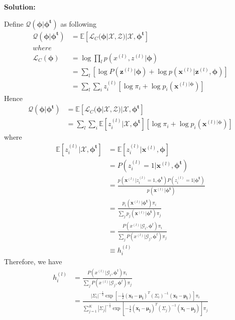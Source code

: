 \documentclass{article}
\newcommand{\E}{\mathbb{E}}
\renewcommand{\b}[1]{\bm{#1}}
\begin{document}
\begin{enumerate}
\begin{enumerate}
		      {\bf Solution:}
              \par Define $\mathcal{Q}(\b{\phi}|\b{\phi^t})$ as following
              \begin{align*}
                \mathcal{Q}(\b{\phi}|\b{\phi^t}) &= \E[\mathcal{L}_C(\b{\phi}|\mathcal{X},\mathcal{Z})|\mathcal{X},\b{\phi^t}]\\
                where&\\
                \mathcal{L}_C(\b{\phi}) &= \log\prod_{l}p(x^{(l)},z^{(l)}|\b{\phi})\\
                &= \sum_l\left[\log P(\b{z}^{(l)}|\b{\phi})+\log p(\b{x}^{(l)}|\b{z}^{(l)},\b{\phi})\right]\\
                &= \sum_l\sum_i z_i^{(l)}[\log \pi_i + \log p_i(\b{x}^{(l)|\b{\phi}})]
              \end{align*}
              Hence
              \begin{align*}
                \mathcal{Q}(\b{\phi}|\b{\phi^t}) &= \E[\mathcal{L}_C(\b{\phi}|\mathcal{X},\mathcal{Z})|\mathcal{X},\b{\phi^t}]\\
                &= \sum_l\sum_i \E[z_i^{(l)}|\mathcal{X},\b{\phi^t}][\log \pi_i + \log p_i(\b{x}^{(l)|\b{\phi}})]
              \end{align*}
              where
              \begin{align*}
                \E[z_i^{(l)}|\mathcal{X},\b{\phi^t}] &= \E[z_i^{(l)}|\b{x}^{(l)},\b{\phi}]\\
                &= P(z_i^{(l)}=1|\b{x}^{(l)},\b{\phi^t})\\
                &= \frac{p(\b{x}^{(l)}|z_i^{(l)}=1,\b{\phi^t})P(z_i^{(l)}=1|\b{\phi^t})}{p(\b{x}^{(l)}|\b{\phi^t})}\\
                &= \frac{p_i(\b{x}^{(l)}|\b{\phi^t})\pi_i}{\sum_jp_j(\b{x}^{(l)}|\b{\phi^t})\pi_j}\\
                &= \frac{P(x^{(l)}|\mathcal{G}_i,\b{\phi}^t)\pi_i}{\sum_jP(x^{(l)}|\mathcal{G}_j,\b{\phi}^t)\pi_j}\\
                &\equiv h_i^{(l)}
              \end{align*}
              Therefore, we have 
              \begin{align*}
                h_i^{(l)} &= \frac{P(x^{(l)}|\mathcal{G}_i,\b{\phi}^t)\pi_i}{\sum_jP(x^{(l)}|\mathcal{G}_j,\b{\phi}^t)\pi_j}\\
                &= \frac{|\Sigma_i|^{-\frac{1}{2}}\exp{[-\frac{1}{2}(\b{x_l}-\b{\mu_i})^T(\Sigma_i)^{-1}(\b{x_l}-\b{\mu_i})]\pi_i}}{\sum_{j=1}^K|\Sigma_j|^{-\frac{1}{2}}\exp{[-\frac{1}{2}(\b{x_l}-\b{\mu_j})^T(\Sigma_j)^{-1}(\b{x_l}-\b{\mu_j})]\pi_j}}\\

\end{align*}
\end{enumerate}
\end{enumerate}
\end{document}

